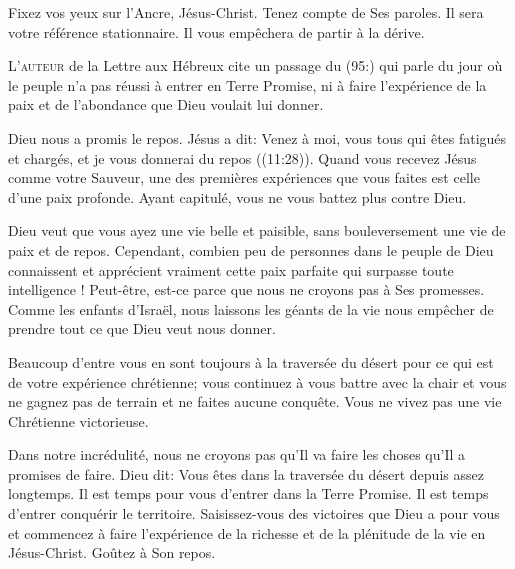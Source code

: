 Fixez vos yeux sur l'Ancre, Jésus-Christ. Tenez compte de Ses paroles.
 Il sera votre référence stationnaire.
 Il vous empêchera de partir à la dérive. 

\dvrule






\lettrine{L}{'auteur} de la Lettre aux Hébreux
 cite un passage du (95:) qui parle du jour où le peuple
 n'a pas réussi à entrer en Terre Promise, ni à faire l'expérience
 de la paix et de l'abondance que Dieu voulait lui donner. 

Dieu nous a promis le repos. Jésus a dit: 
 \Og Venez à moi, vous tous qui êtes fatigués et chargés,
 et je vous donnerai du repos \Fg{} ((11:28)).
 Quand vous recevez Jésus comme votre Sauveur, une des premières expériences
 que vous faites est celle d'une paix profonde.
 Ayant capitulé, vous ne vous battez plus contre Dieu. 


Dieu veut que vous ayez une vie belle et paisible, sans bouleversement
 \ocadr une vie de paix et de repos.
 Cependant, combien peu de personnes dans le peuple de Dieu connaissent
 et apprécient vraiment cette paix parfaite qui surpasse toute intelligence !
 Peut-être,  est-ce parce que nous ne croyons pas
 à Ses promesses.
 Comme les enfants d'Israël, nous laissons les géants de la vie
 nous empêcher de prendre tout ce que Dieu veut nous donner. 

Beaucoup d'entre vous en sont toujours à la traversée du désert
 pour ce qui est de votre expérience chrétienne;
 vous continuez à vous battre avec la chair et vous ne gagnez pas de terrain
 et ne faites aucune conquête. Vous ne vivez pas
 une vie Chrétienne 
 victorieuse. 

Dans notre incrédulité, nous ne croyons pas qu'Il va faire les choses
 qu'Il a promises 
 de faire.
 Dieu dit: 
 \Og Vous êtes dans la traversée du désert depuis assez longtemps.
 Il est temps pour vous d'entrer dans la Terre Promise.
 Il est temps d'entrer conquérir le territoire. \Fg{}
 Saisissez-vous 
 des victoires que Dieu a pour vous et commencez à faire l'expérience
 de la richesse et de la plénitude de la vie en Jésus-Christ.
 Goûtez à Son repos. 

